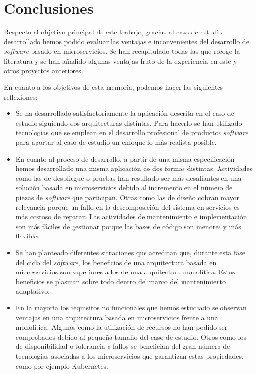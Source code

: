 \documentclass[11pt,spanish,listoffigures]{tfgetsinf}
\begin{document}

\chapter{Conclusiones} \label{ch:Conclusiones}

Respecto al objetivo principal de este trabajo, gracias al caso de estudio desarrollado hemos podido evaluar las ventajas e inconvenientes del desarrollo de \textit{software} basado en microservicios. Se han recapitulado todas las que recoge la literatura y se han añadido algunas ventajas fruto de la experiencia en este y otros proyectos anteriores. 

En cuanto a los objetivos de esta memoria, podemos hacer las siguientes reflexiones:

\begin{itemize}

\item Se ha desarrollado satisfactoriamente la aplicación descrita en el caso de estudio siguiendo dos arquitecturas distintas. Para hacerlo se han utilizado tecnologías que se emplean en el desarrollo profesional de productos \textit{software} para aportar al caso de estudio un enfoque lo más realista posible.

\item En cuanto al proceso de desarrollo, a partir de una misma especificación hemos desarrollado una misma aplicación de dos formas distintas. Actividades como las de despliegue o pruebas han resultado ser más desafiantes en una solución basada en microservicios debido al incremento en el número de piezas de \textit{software} que participan. Otras como las de diseño cobran mayor relevancia porque un fallo en la descomposición del sistema en servicios es más costoso de reparar. Las actividades de mantenimiento e implementación son más fáciles de gestionar porque las bases de código son menores y más flexibles.

\item Se han planteado diferentes situaciones que acreditan que, durante esta fase del ciclo del \textit{software}, los beneficios de una arquitectura basada en microservicios son superiores a los de una arquitectura monolítica. Estos beneficios se plasman sobre todo dentro del marco del mantenimiento adaptativo.

\item En la mayoría los requisitos no funcionales que hemos estudiado se observan ventajas en una arquitectura basada en microservicios frente a una monolítica. Algunos como la utilización de recursos no han podido ser comprobados debido al pequeño tamaño del caso de estudio. Otros como los de disponibilidad o tolerancia a fallos se benefician del gran número de tecnologías asociadas a los microservicios que garantizan estas propiedades, como por ejemplo Kubernetes.

\end{itemize}
\end{document}
